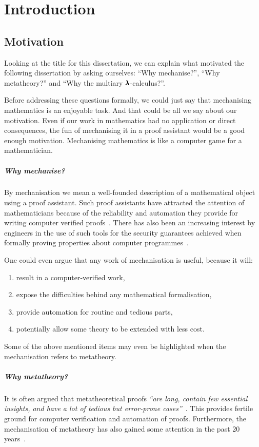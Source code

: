 \chapter{Introduction}
\label{c:intro}

\section{Motivation}
Looking at the title for this dissertation, we can explain what motivated the following dissertation by asking ourselves: ``Why mechanise?'', ``Why metatheory?'' and ``Why the multiary $\pmb{\lambda}$-calculus?''.

Before addressing these questions formally, we could just say that mechanising mathematics is an enjoyable task.
And that could be all we say about our motivation.
Even if our work in mathematics had no application or direct consequences, the fun of mechanising it in a proof assistant would be a good enough motivation.
Mechanising mathematics is like a computer game for a mathematician.

\paragraph{Why mechanise?}
By mechanisation we mean a well-founded description of a mathematical object using a proof assistant.
Such proof assistants have attracted the attention of mathematicians because of the reliability and automation they provide for writing computer verified proofs~\cite{FourColourThm}.
There has also been an increasing interest by engineers in the use of such tools for the security guarantees achieved when formally proving properties about computer programmes~\cite{CompCert}.

One could even argue that any work of mechanisation is useful, because it will:
\begin{enumerate}
\item result in a computer-verified work,
\item expose the difficulties behind any mathematical formalisation,
\item provide automation for routine and tedious parts,
\item potentially allow some theory to be extended with less cost.
\end{enumerate}

Some of the above mentioned items may even be highlighted when the mechanisation refers to metatheory.

\paragraph{Why metatheory?}
It is often argued that metatheoretical proofs \textit{``are long, contain few essential insights, and have a lot of tedious but error-prone cases''}~\cite{AutosubstSchafer}.
This provides fertile ground for computer verification and automation of proofs.
Furthermore, the mechanisation of metatheory has also gained some attention in the past 20 years~\cite{POPLmark, POPLmarkReloaded}.


